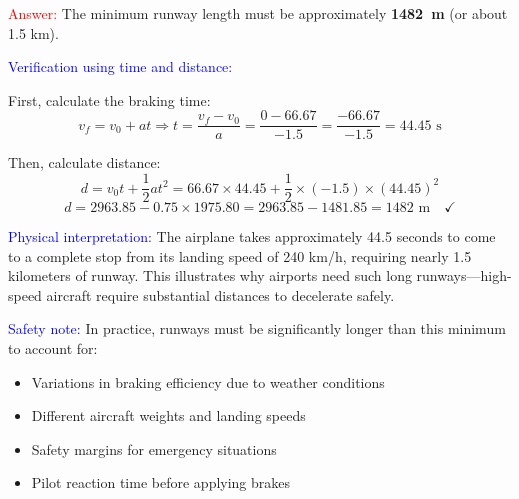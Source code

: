\begin{exercise}
\begin{solu}
        \textcolor{red}{Answer:} The minimum runway length must be approximately \textbf{\qty{1482}{\m}} (or about 1.5 km).

        \vspace{0.3cm}

        \textcolor{blue}{Verification using time and distance:}

        First, calculate the braking time:
        \[
            v_f = v_0 + at \Rightarrow t = \frac{v_f - v_0}{a} = \frac{0 - 66.67}{-1.5} = \frac{-66.67}{-1.5} = 44.45 \text{ s}
        \]

        Then, calculate distance:
        \[
            d = v_0 t + \frac{1}{2}at^2 = 66.67 \times 44.45 + \frac{1}{2} \times (-1.5) \times (44.45)^2
        \]
        \[
            d = 2963.85 - 0.75 \times 1975.80 = 2963.85 - 1481.85 = 1482 \text{ m} \quad \checkmark
        \]

        \textcolor{blue}{Physical interpretation:} The airplane takes approximately 44.5 seconds to come to a complete stop from its landing speed of 240 km/h, requiring nearly 1.5 kilometers of runway. This illustrates why airports need such long runways—high-speed aircraft require substantial distances to decelerate safely.

        \textcolor{blue}{Safety note:} In practice, runways must be significantly longer than this minimum to account for:
        \begin{itemize}
            \item Variations in braking efficiency due to weather conditions
            \item Different aircraft weights and landing speeds
            \item Safety margins for emergency situations
            \item Pilot reaction time before applying brakes
        \end{itemize}
    \end{solu}
\end{exercise}

